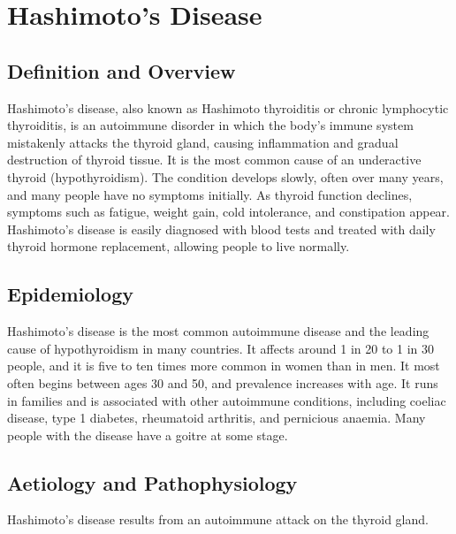 \chapter{Hashimoto's Disease}

\section*{Definition and Overview}
Hashimoto's disease, also known as Hashimoto thyroiditis or chronic lymphocytic thyroiditis, is an autoimmune disorder in which the body's immune system mistakenly attacks the thyroid gland, causing inflammation and gradual destruction of thyroid tissue. It is the most common cause of an underactive thyroid (hypothyroidism). The condition develops slowly, often over many years, and many people have no symptoms initially. As thyroid function declines, symptoms such as fatigue, weight gain, cold intolerance, and constipation appear. Hashimoto's disease is easily diagnosed with blood tests and treated with daily thyroid hormone replacement, allowing people to live normally.

\section*{Epidemiology}
Hashimoto's disease is the most common autoimmune disease and the leading cause of hypothyroidism in many countries. It affects around 1 in 20 to 1 in 30 people, and it is five to ten times more common in women than in men. It most often begins between ages 30 and 50, and prevalence increases with age. It runs in families and is associated with other autoimmune conditions, including coeliac disease, type 1 diabetes, rheumatoid arthritis, and pernicious anaemia. Many people with the disease have a goitre at some stage.

\section*{Aetiology and Pathophysiology}
Hashimoto's disease results from an autoimmune attack on the thyroid gland.

